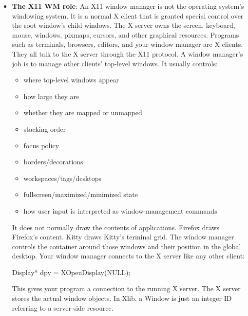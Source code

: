 \documentclass{report}
\begin{document}
    \begin{itemize}
        \item \textbf{The X11 WM role}: An X11 window manager is not the operating system’s windowing system. It is a normal X client that is granted special control over the root window’s child windows.
            \bigbreak \noindent 
            The X server owns the screen, keyboard, mouse, windows, pixmaps, cursors, and other graphical resources. Programs such as terminals, browsers, editors, and your window manager are X clients. They all talk to the X server through the X11 protocol.
            \bigbreak \noindent 
            A window manager’s job is to manage other clients’ top-level windows.
            \bigbreak \noindent 
            It usually controls:
            \begin{itemize}
                \item where top-level windows appear
                \item how large they are
                \item whether they are mapped or unmapped
                \item stacking order
                \item focus policy
                \item borders/decorations
                \item workspaces/tags/desktops
                \item fullscreen/maximized/minimized state
                \item how user input is interpreted as window-management commands
            \end{itemize}
            It does not normally draw the contents of applications. Firefox draws Firefox’s content. Kitty draws Kitty’s terminal grid. The window manager controls the container around those windows and their position in the global desktop.
            \bigbreak \noindent 
            Your window manager connects to the X server like any other client:
            \bigbreak \noindent 
            \begin{cppcode}
            Display* dpy = XOpenDisplay(NULL);
            \end{cppcode}
            \bigbreak \noindent 
            This gives your program a connection to the running X server.
            \bigbreak \noindent 
            The X server stores the actual window objects. In Xlib, a Window is just an integer ID referring to a server-side resource.
            \bigbreak \noindent 

\end{itemize}
\end{document}
